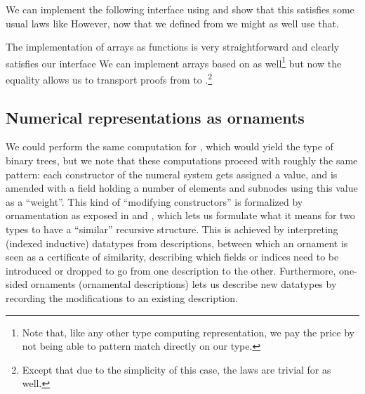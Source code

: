 We can implement the following interface using 
and show that this satisfies some usual laws like
However, now that we defined  from  we might as well use that.

The implementation of arrays as functions is very straightforward
and clearly satisfies our interface
We can implement arrays based on  as well\footnote{Note that, like any other type computing representation, we pay the price by not being able to pattern match directly on our type.}
but now the equality allows us to transport proofs from  to .\footnote{Except that due to the simplicity of this case, the laws are trivial for  as well.}


\subsection{Numerical representations as ornaments}\label{ssec:ornaments}
We could perform the same computation for \bL{}, which would yield the type of binary trees, but we note that these computations proceed with roughly the same pattern: each constructor of the numeral system gets assigned a value, and is amended with a field holding a number of elements and subnodes using this value as a ``weight''. This kind of ``modifying constructors'' is formalized by ornamentation as exposed in \cite{algorn} and \cite{progorn}, which lets us formulate what it means for two types to have a ``similar'' recursive structure. This is achieved by interpreting (indexed inductive) datatypes from descriptions, between which an ornament is seen as a certificate of similarity, describing which fields or indices need to be introduced or dropped to go from one description to the other. Furthermore, one-sided ornaments (ornamental descriptions) lets us describe new datatypes by recording the modifications to an existing description.


